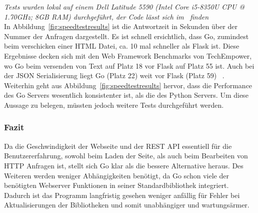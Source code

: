 \textit{Tests wurden lokal auf einem Dell Latitude 5590 (Intel Core i5-8350U CPU
@ 1.70GHz; 8GB RAM) durchgeführt, der Code lässt sich im~ finden} \\[2ex]

In Abbildung~\ref{fig:speedtestresults} ist die Antwortzeit in Sekunden über der Nummer 
der Anfragen dargestellt. Es ist schnell ersichtlich, dass Go, zumindest beim 
verschicken einer HTML Datei, ca. 10 mal schneller als Flask ist. Diese Ergebnisse 
decken sich mit den Web Framework Benchmarks von TechEmpower, wo Go beim 
versenden von Text auf Platz 18 vor Flask auf Platz 55 ist. Auch bei der 
\gls{JSON} Serialisierung liegt Go (Platz 22) weit vor Flask (Platz 59)
~\cite{Tec21}. Weiterhin geht aus Abbildung~\ref{fig:speedtestresults} hervor, 
dass die Performance des Go Servers wesentlich konsistenter ist, als die des Python Servers. 
Um diese Aussage zu belegen, müssten jedoch weitere Tests durchgeführt werden.\\

\subsubsection{Fazit}
Da die Geschwindigkeit der Webseite und der \gls{REST} \gls{API} essentiell für 
die Benutzererfahrung, sowohl beim Laden der Seite, als auch beim Bearbeiten
von \gls{HTTP} Anfragen ist, stellt sich Go klar als die bessere Alternative heraus.
Des Weiteren werden weniger Abhängigkeiten benötigt, da
Go schon viele der benötigten Webserver Funktionen in seiner Standardbibliothek integriert.
Dadurch ist das Programm langfristig gesehen weniger anfällig für Fehler bei 
Aktualisierungen der Bibliotheken und somit unabhängiger und wartungsärmer.

\newpage